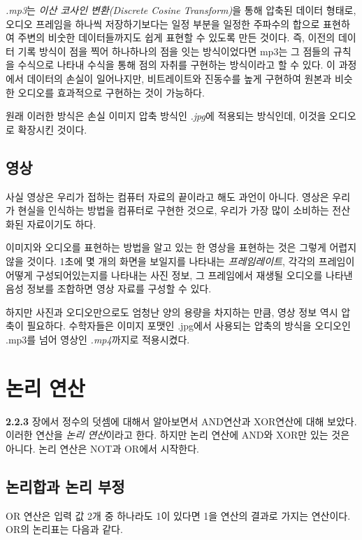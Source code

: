 \documentclass{article}
\begin{document}
\textit{.mp3}는 \textit{이산 코사인 변환(Discrete Cosine Transform)}을 통해 압축된
데이터 형태로, 오디오 프레임을 하나씩 저장하기보다는 일정 부분을 일정한 주파수의 합으로 표현하여
주변의 비숫한 데이터들까지도 쉽게 표현할 수 있도록 만든 것이다.
즉, 이전의 데이터 기록 방식이 점을 찍어 하나하나의 점을 잇는 방식이었다면
mp3는 그 점들의 규칙을 수식으로 나타내 수식을 통해 점의 자취를 구현하는 방식이라고 할 수 있다.
이 과정에서 데이터의 손실이 일어나지만, 비트레이트와 진동수를 높게 구현하여
원본과 비슷한 오디오를 효과적으로 구현하는 것이 가능하다.

원래 이러한 방식은 손실 이미지 압축 방식인 \textit{.jpg}에 적용되는 방식인데,
이것을 오디오로 확장시킨 것이다.

\subsection{영상}

사실 영상은 우리가 접하는 컴퓨터 자료의 끝이라고 해도 과언이 아니다.
영상은 우리가 현실을 인식하는 방법을 컴퓨터로 구현한 것으로, 우리가 가장 많이 소비하는
전산화된 자료이기도 하다.

이미지와 오디오를 표현하는 방법을 알고 있는 한 영상을 표현하는 것은 그렇게 어렵지 않을 것이다.
1초에 몇 개의 화면을 보일지를 나타내는 \textit{프레임레이트}, 각각의 프레임이 어떻게 구성되어있는지를
나타내는 사진 정보, 그 프레임에서 재생될 오디오를 나타낸 음성 정보를 조합하면 영상 자료를
구성할 수 있다.

하지만 사진과 오디오만으로도 엄청난 양의 용량을 차지하는 만큼, 영상 정보 역시 압축이 필요하다.
수학자들은 이미지 포맷인 .jpg에서 사용되는 압축의 방식을 오디오인 .mp3를 넘어
영상인 \textit{.mp4}까지로 적용시켰다.

\section{논리 연산}

\textbf{2.2.3} 장에서 정수의 덧셈에 대해서 알아보면서 AND연산과 XOR연산에 대해 보았다. 이러한 연산을
\textit{논리 연산}이라고 한다.
하지만 논리 연산에 AND와 XOR만 있는 것은 아니다. 논리 연산은 NOT과 OR에서 시작한다.

\subsection{논리합과 논리 부정}

OR 연산은 입력 값 2개 중 하나라도 1이 있다면 1을 연산의 결과로 가지는 연산이다.
OR의 논리표는 다음과 같다.
\end{document}
